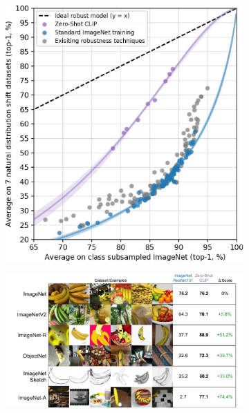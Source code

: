 \begin{description}
\begin{remark}
            \begin{figure}[H]
                \centering
                \begin{subfigure}{0.35\linewidth}
                    \centering
                    \includegraphics[width=\linewidth]{./img/_clip_resnet_distributional_shift.jpg}
                \end{subfigure}
                \hfill
                \begin{subfigure}{0.6\linewidth}
                    \centering
                    \includegraphics[width=\linewidth]{./img/_clip_resnet_distributional_shift_datasets.jpg}
                \end{subfigure}
            \end{figure}
        \end{remark}
\end{description}

